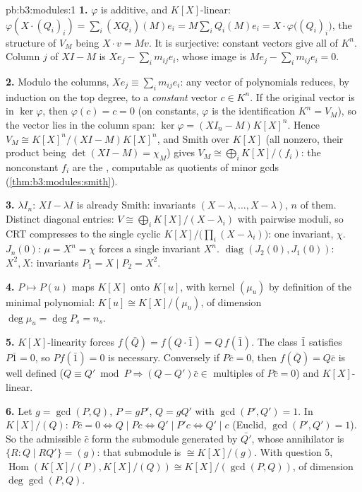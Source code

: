\begin{solution}{pb:b3:modules:1}
\textbf{1.} $\varphi$ is additive, and $K[X]$-linear: $\varphi(X
\cdot (Q_i)_i) = \sum_i (XQ_i)(M)e_i = M\sum_i Q_i(M)e_i = X
\cdot \varphi\bigl((Q_i)_i\bigr)$, the  structure of $V_M$
being $X \cdot v = Mv$. It is surjective: constant vectors give
all of $K^n$. Column $j$ of $XI - M$ is $Xe_j - \sum_i
m_{ij}e_i$, whose image is $Me_j - \sum_i m_{ij}e_i = 0$.

\textbf{2.} Modulo the columns, $Xe_j \equiv \sum_i m_{ij}e_i$:
any vector of polynomials reduces, by induction on the top
degree, to a \emph{constant} vector $c \in K^n$. If the original
vector is in $\ker\varphi$, then $\varphi(c) = c = 0$ (on
constants, $\varphi$ is the identification $K^n = V_M$), so the
vector lies in the column span: $\ker\varphi = (XI_n -
M)K[X]^n$. Hence $V_M \cong K[X]^n/(XI - M)K[X]^n$, and Smith
over $K[X]$ (all  nonzero, their product being
$\det(XI - M) = \chi_M$) gives $V_M \cong \bigoplus_i
K[X]/(f_i)$: the nonconstant $f_i$ are the , computable as quotients of minor gcds
(\cref{thm:b3:modules:smith}).

\textbf{3.} $\lambda I_n$: $XI - \lambda I$ is already Smith:
invariants $(X - \lambda, \dots, X - \lambda)$, $n$ of them.
Distinct diagonal entries: $V \cong \bigoplus_i K[X]/(X -
\lambda_i)$ with pairwise  moduli, so CRT compresses to
the single cyclic $K[X]/\bigl(\prod_i(X - \lambda_i)\bigr)$:
one invariant, $\chi$. $J_n(0)$: $\mu = X^n = \chi$ forces a
single invariant $X^n$. $\operatorname{diag}(J_2(0), J_1(0))$:
 $X^2, X$: invariants $P_1 = X \mid P_2 =
X^2$.

\textbf{4.} $P \mapsto P(u)$ maps $K[X]$ onto $K[u]$, with
kernel $(\mu_u)$ by definition of the minimal polynomial: $K[u]
\cong K[X]/(\mu_u)$, of dimension $\deg\mu_u = \deg P_s = n_s$.

\textbf{5.} $K[X]$-linearity forces $f(\bar Q) = f(Q\cdot\bar 1)
= Q\,f(\bar 1)$. The class $\bar 1$ satisfies $P \bar 1 = 0$, so
$P f(\bar 1) = 0$ is necessary. Conversely if $P\bar c = 0$,
then $f(\bar Q) = Q\bar c$ is well defined ($Q \equiv Q' \bmod P
\Rightarrow (Q - Q')\bar c \in$ multiples of $P\bar c = 0$) and
$K[X]$-linear.

\textbf{6.} Let $g = \gcd(P, Q)$, $P = gP'$, $Q = gQ'$ with
$\gcd(P', Q') = 1$. In $K[X]/(Q)$: $P\bar c = 0 \iff Q \mid Pc
\iff Q' \mid P'c \iff Q' \mid c$ (Euclid, $\gcd(P', Q') = 1$).
So the admissible $\bar c$ form the submodule generated by
$\bar{Q'}$, whose annihilator is $\{R : Q \mid RQ'\} = (g)$:
that submodule is $\cong K[X]/(g)$. With question 5,
$\operatorname{Hom}(K[X]/(P), K[X]/(Q)) \cong K[X]/(\gcd(P,Q))$,
of dimension $\deg\gcd(P,Q)$.


\end{solution}
